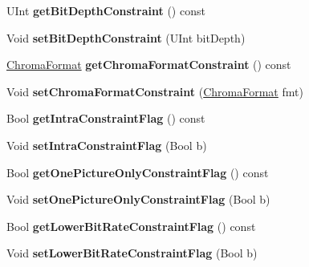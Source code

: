 \begin{DoxyCompactItemize}
U\+Int {\bfseries get\+Bit\+Depth\+Constraint} () const
\item 
\mbox{\label{class_profile_tier_level_a2602f2b028405dca85573b60588834cf}} 
Void {\bfseries set\+Bit\+Depth\+Constraint} (U\+Int bit\+Depth)
\item 
\mbox{\label{class_profile_tier_level_aa49c99de4aae5e280eab13b027a9ae2a}} 
\hyperlink{_type_def_8h_a4a6c51c10f2eb04abc7209db7caff39f}{Chroma\+Format} {\bfseries get\+Chroma\+Format\+Constraint} () const
\item 
\mbox{\label{class_profile_tier_level_a1b24f7e278a85f4e2808d6eaf3d26441}} 
Void {\bfseries set\+Chroma\+Format\+Constraint} (\hyperlink{_type_def_8h_a4a6c51c10f2eb04abc7209db7caff39f}{Chroma\+Format} fmt)
\item 
\mbox{\label{class_profile_tier_level_a1cf011916f604703b7495cd2d085b7a6}} 
Bool {\bfseries get\+Intra\+Constraint\+Flag} () const
\item 
\mbox{\label{class_profile_tier_level_a7c17491d572e79e928a1aa6df89e9292}} 
Void {\bfseries set\+Intra\+Constraint\+Flag} (Bool b)
\item 
\mbox{\label{class_profile_tier_level_a2d001038994ea420834c75be7df6dd73}} 
Bool {\bfseries get\+One\+Picture\+Only\+Constraint\+Flag} () const
\item 
\mbox{\label{class_profile_tier_level_a51356cd38b47b5403a0a84ed7cd081c9}} 
Void {\bfseries set\+One\+Picture\+Only\+Constraint\+Flag} (Bool b)
\item 
\mbox{\label{class_profile_tier_level_a687fddb687bba24b656cbeaa18783084}} 
Bool {\bfseries get\+Lower\+Bit\+Rate\+Constraint\+Flag} () const
\item 
\mbox{\label{class_profile_tier_level_aa359704334eb05dd4dba9b39dcb5676a}} 
Void {\bfseries set\+Lower\+Bit\+Rate\+Constraint\+Flag} (Bool b)
\item 
\mbox{\label{class_profile_tier_level_af0c006bbc4c4c6b86681d7fc1059243c}} 

\end{DoxyCompactItemize}
